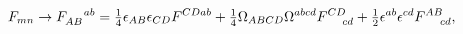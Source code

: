 \begin{equation}
\label{2.4}
F_{mn} \rightarrow F_{AB}^{\!~~~~ab} = \hbox{$\frac{1}{4}$} \epsilon_{AB}
\epsilon_{CD} F^{CD ab} +
\hbox{$\frac{1}{4}$} \Omega_{ABCD}
\Omega^{abcd} F^{CD}_{\!~~~~cd} +
\hbox{$\frac{1}{2}$} \epsilon^{ab}
\epsilon^{cd} F^{AB}_{\!~~~~cd},
\end{equation}

